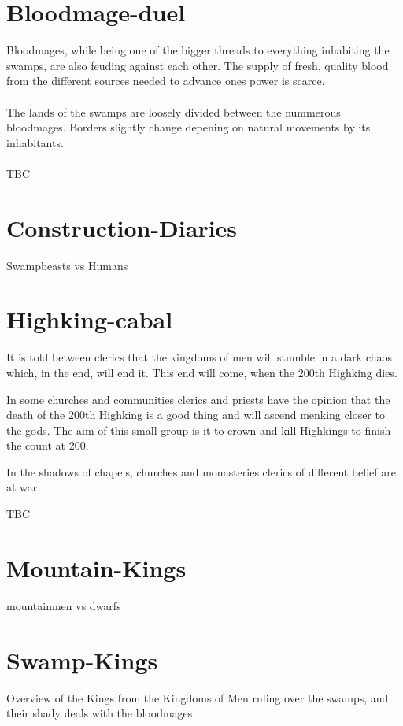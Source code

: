 \documentclass[a5paper,pagesize,10pt,bibtotoc,pointlessnumbers,
normalheadings,DIV=9,twoside=false]{scrbook}
\begin{document}
\newpage
\section{Bloodmage-duel}

Bloodmages, while being one of the bigger threads to everything inhabiting the swamps, are also feuding against each other. The supply of fresh, quality blood from the different sources needed to advance ones power is scarce.\\
\\
The lands of the swamps are loosely divided between the nummerous bloodmages. Borders slightly change depening on natural movements by its inhabitants.\\
\\
TBC

\newpage
\section{Construction-Diaries}

Swampbeasts vs Humans

\newpage
\section{Highking-cabal}

It is told between clerics that the kingdoms of men will stumble in a dark chaos which, in the end, will end it. This end will come, when the 200th Highking dies.

In some churches and communities clerics and priests have the opinion that the death of the 200th Highking is a good thing and will ascend menking closer to the gods.
The aim of this small group is it to crown and kill Highkings to finish the count at 200.

In the shadows of chapels, churches and monasteries clerics of different belief are at war.

TBC

\newpage
\section{Mountain-Kings}

mountainmen vs dwarfs

\newpage
\section{Swamp-Kings}

Overview of the Kings from the Kingdoms of Men ruling over the swamps, and their shady deals with the bloodmages.
\end{document}
